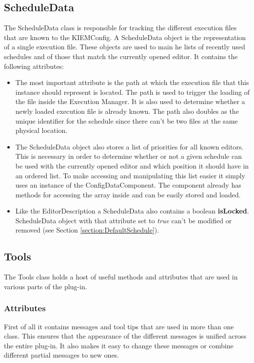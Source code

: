 \subsection{ScheduleData}
\label{section:ScheduleData}
The ScheduleData class is responsible for tracking the different execution files that are known
to the \ac{KIEMConfig}. A ScheduleData object is the representation of a single execution file. 
These objects are used to main he lists of recently used schedules and of those that match the 
currently opened editor. It contains the following attributes:
\begin{itemize}
 \item The most important attribute is the path at which the execution file that this instance
should represent is located. The path is used to trigger the loading of the file inside
the Execution Manager. It is also used to determine whether a newly loaded execution file
is already known. The path also doubles as the unique identifier for the schedule since there
can't be two files at the same physical location.
\item The ScheduleData object also stores a list of priorities for all known editors. This is
necessary in order to determine whether or not a given schedule can be used with the currently
opened editor and which position it should have in an ordered list. To make accessing and manipulating
this list easier it simply uses an instance of the ConfigDataComponent. The component already has
methods for accessing the array inside and can be easily stored and loaded.
 \item Like the EditorDescription a ScheduleData also contains a boolean \textbf{isLocked}. ScheduleData
object with that attribute set to \textit{true} can't be modified or removed (see Section \ref{section:DefaultSchedule}).
\end{itemize}

\subsection{Tools}
\label{section:Tools}
The Tools class holds a host of useful methods and attributes that are used in various parts of the plug-in.

\subsubsection{Attributes}
\label{section:ToolsAttributes}
First of all it contains messages and tool tips that are used in more than one class.
This ensures that the appearance of the different messages is unified across the entire plug-in. It also
makes it easy to change these messages or combine different partial messages to new ones.

